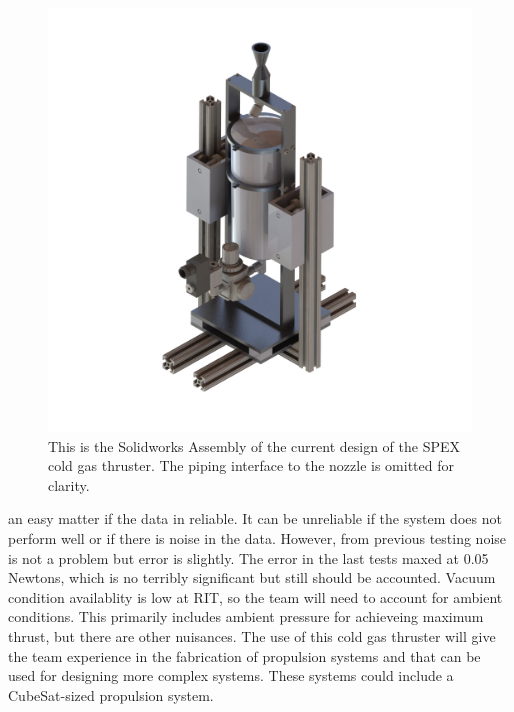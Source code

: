 \documentclass[conference]{IEEEtran} %
\begin{document}
\begin{figure}[h]
  \includegraphics[width=\linewidth]{figs/cold-gas-thruster.png}
  \caption{This is the Solidworks Assembly of the current design of the SPEX cold gas thruster. The piping interface to the nozzle is omitted for clarity.}
\label{fig:lifecycle}
\end{figure}

an easy matter if the data in reliable. It can be unreliable if the system does not perform well or if there is noise in the data.
However, from previous testing noise is not a problem but error is slightly. The error in the last tests maxed at 0.05 Newtons, which is no terribly significant but still should be accounted.
Vacuum condition availablity is low at RIT, so the team will need to account for ambient conditions. This primarily includes ambient pressure for achieveing maximum thrust, but there are other
nuisances. The use of this cold gas thruster will give the team experience in the fabrication of propulsion systems and that can be used for designing more complex systems. These systems could
 include a CubeSat-sized propulsion system.



\end{document}
